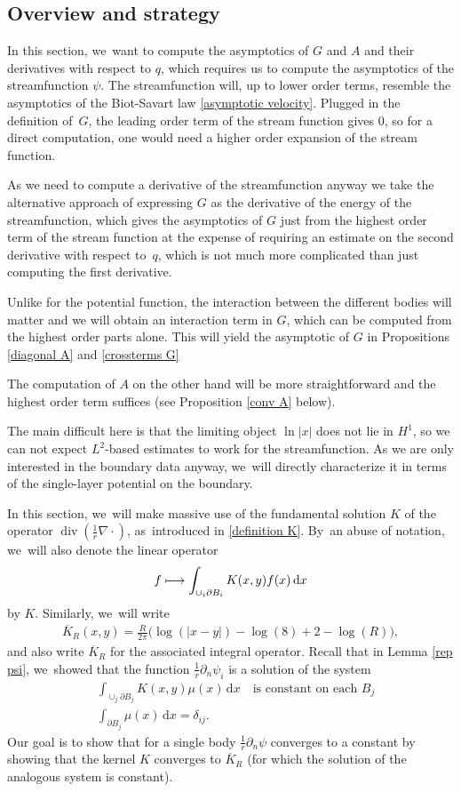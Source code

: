 \documentclass[JEP,XML,SOM,Unicode,published]{cedram}
\newcommand\mto{\mathchoice{\longmapsto}{\mapsto}{\mapsto}{\mapsto}}
\theoremstyle{definition}
\renewcommand{\div}{\operatorname{div}}
\newcommand\eq{=}
\newcommand\dd{\,\mathrm{d}}
\newcommand\dx{\dd x}
\let\de\partial
\begin{document}
\subsection{Overview and strategy}
In this section, we~want to compute the asymptotics of $G$ and $A$ and their derivatives with respect to $q$, which requires us to compute the asymptotics of the streamfunction $\psi$. The streamfunction will, up to lower order terms, resemble the asymptotics of the Biot-Savart law \eqref{asymptotic velocity}. Plugged in the definition of~$G$, the leading order term of the stream function gives $0$, so for a direct computation, one would need a higher order expansion of the stream function.

As we need to compute a derivative of the streamfunction anyway we take the alternative approach of expressing $G$ as the derivative of the energy of the streamfunction, which gives the asymptotics of $G$ just from the highest order term of the stream function at the expense of requiring an estimate on the second derivative with respect to~$q$, which is not much more complicated than just computing the first derivative.

Unlike for the potential function, the interaction between the different bodies will matter and we will obtain an interaction term in $G$, which can be computed from the highest order parts alone. This will yield the asymptotic of $G$ in Propositions \ref{diagonal A} and \ref{crossterms G}

The computation of $A$ on the other hand will be more straightforward and the highest order term suffices (see Proposition \ref{conv A} below).

The main difficult here is that the limiting object $\ln|x|$ does not lie in $H^1$, so we can not expect $L^2$-based estimates to work for the streamfunction. As we are only interested in the boundary data anyway, we~will directly characterize it in terms of the single-layer potential on the boundary.

In this section, we~will make massive use of the fundamental solution $K$ of the operator $\div(\frac{1}{r}\nabla\cdot)$, as~introduced in \eqref{definition K}. By~an abuse of notation, we~will also denote the linear operator
\begin{align*}
f\mto \int_{\cup_i\de B_i}K(x,y)f(x)\dx
\end{align*}
by $K$. Similarly, we~will write
\begin{align*}\overline{K}_R(x,y)=\frac{R}{2\pi}\bigl(\log(|x-y|)-\log(8)+2-\log(R)\bigr),
\end{align*}
and also write $\overline{K}_R$ for the associated integral operator.
Recall that in Lemma \ref{rep psi}, we~showed that the function $\frac{1}{r}\de_n \psi_i$ is a solution of the system
\begin{align}
&\int_{\cup_j\de B_j}K(x,y)\mu(x)\dx \quad\text{is constant on each $B_j$}\label{K eq 1}\\
&\int_{\de B_j}\mu(x)\dx\eq\delta_{ij}.\label{K eq 2}
\end{align}
Our goal is to show that for a single body $\frac{1}{r}\de_n\psi$ converges to a constant by showing that the kernel $K$ converges to $\overline{K}_R$ (for which the solution of the analogous system is constant).
\end{document}
